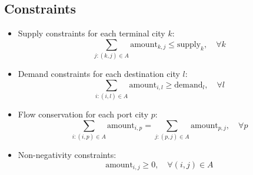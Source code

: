 \documentclass{article}
\begin{document}
\subsection*{Constraints}
\begin{itemize}
    \item Supply constraints for each terminal city \(k\):
    \[
    \sum_{j: (k,j) \in A} \text{amount}_{k,j} \leq \text{supply}_k, \quad \forall k
    \]
    
    \item Demand constraints for each destination city \(l\):
    \[
    \sum_{i: (i,l) \in A} \text{amount}_{i,l} \geq \text{demand}_l, \quad \forall l
    \]
    
    \item Flow conservation for each port city \(p\):
    \[
    \sum_{i: (i,p) \in A} \text{amount}_{i,p} = \sum_{j: (p,j) \in A} \text{amount}_{p,j}, \quad \forall p
    \]

    \item Non-negativity constraints:
    \[
    \text{amount}_{i,j} \geq 0, \quad \forall (i,j) \in A
    \]
\end{itemize}
\end{document}
